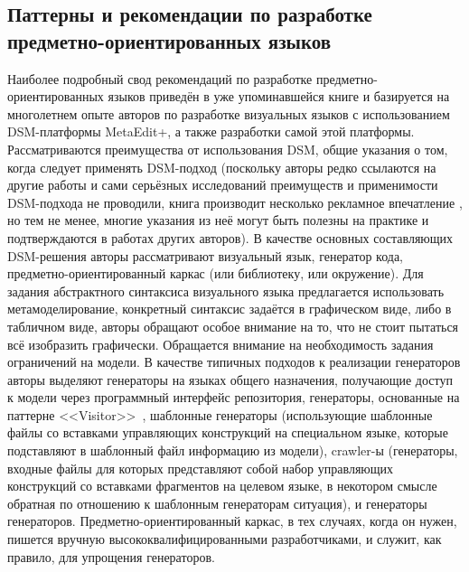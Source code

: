 \subsection{Паттерны и рекомендации по разработке предметно-ориентированных языков}
Наиболее подробный свод рекомендаций по разработке предметно-ориентированных языков
приведён в уже упоминавшейся книге \cite{kelly2008domain} и базируется на многолетнем
опыте авторов по разработке визуальных языков с использованием \ac{DSM}-платформы MetaEdit+,
а также разработки самой этой платформы. Рассматриваются преимущества от использования
\ac{DSM}, общие указания о том, когда следует применять \ac{DSM}-подход (поскольку авторы редко
ссылаются на другие работы и сами серьёзных исследований преимуществ и применимости
\ac{DSM}-подхода не проводили, книга производит несколько рекламное впечатление%
, но тем не менее, многие указания из неё могут быть полезны на практике и подтверждаются в работах других 
авторов). В качестве основных составляющих \ac{DSM}-решения авторы рассматривают визуальный 
язык, генератор кода, предметно-ориентированный каркас (или библиотеку, или окружение). 
Для задания абстрактного синтаксиса визуального языка предлагается использовать метамоделирование, 
конкретный синтаксис задаётся в графическом виде, либо в табличном виде, авторы обращают особое 
внимание на то, что не стоит пытаться всё изобразить графически. Обращается внимание 
на необходимость задания ограничений на модели. В качестве типичных подходов к реализации 
генераторов авторы выделяют генераторы на языках общего назначения, получающие доступ 
к модели через программный интерфейс репозитория, генераторы, основанные на паттерне <<Visitor>>~\cite{gamma2001patterns }, 
шаблонные генераторы (использующие шаблонные файлы со вставками управляющих конструкций на специальном языке, которые 
подставляют в шаблонный файл информацию из модели), crawler-ы (генераторы, входные файлы для которых представляют собой набор 
управляющих конструкций со вставками фрагментов на целевом языке, в некотором смысле 
обратная по отношению к шаблонным генераторам ситуация), и генераторы генераторов. 
Предметно-ориентированный каркас, в тех случаях, когда он нужен, пишется вручную высококвалифицированными 
разработчиками, и служит, как правило, для упрощения генераторов.

